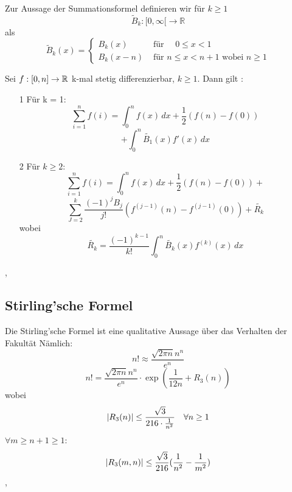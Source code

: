 Zur Aussage der Summationsformel definieren wir für $k \geq 1$
$$
\widetilde{B}_{k}:[0, \infty[\longrightarrow \mathbb{R}
$$
als
$$
\widetilde{B}_{k}(x)=\left\{\begin{array}{ll}
B_{k}(x) & \text { für } \quad 0 \leq x<1 \\
B_{k}(x-n) & \text { für } n \leq x<n+1 \text { wobei } n \geq 1
\end{array}\right.
$$

\Satz[5.44] Sei \(f:[0,n] \rightarrow \mathbb{R} \) k-mal stetig differenzierbar, \(k \geq 1\). Dann gilt :
\begin{enumerate}
    \item [1] Für k = 1:
    \[ \sum_{i=1}^{n} f(i) = \int_{0}^{n} f(x) \,dx + \frac{1}{2} (f(n) - f(0))\]
    \[ + \int_{0}^{n} \tilde{B_1} (x) f'(x) \,dx \]
    \item [2] Für \( k \geq 2\):
    \[ \sum_{i=1}^{n}f(i) = \int_{0}^{n} f(x) \,dx + \frac{1}{2}(f(n) - f(0)) + \] 
    \[\sum_{J=2}^{k} \frac{(-1)^jB_j}{j!}(f^{(j-1)}(n) - f^{(j-1)}(0)) + \tilde{R_k}\]
    wobei
    \[ \tilde{R_k} = \frac{(-1)^{k-1}}{k!} \int_{0}^{n} \tilde{B_k}(x)f^{(k)}(x) \,dx \]
\end{enumerate}
\sep
\subsection{Stirling'sche Formel}
Die Stirling'sche Formel ist eine qualitative Aussage über das Verhalten der Fakultät
Nämlich:
\[ n! \approx \frac{\sqrt{2 \pi n} n^n}{e^n}\]
\Satz[5.47] \[n! = \frac{\sqrt{2 \pi n} n^n}{e^n} \cdot \exp(\frac{1}{12n}+ R_3(n))\]
wobei
\[ \left\lvert R_3(n) \right\rvert \leq \frac{\sqrt{3}}{216 \cdot \frac{1}{n^2}} \quad \forall n \geq 1\]
\Lemma[5.48] \( \forall m \geq n + 1 \geq 1\):
\[ \left\lvert R_3(m,n) \right\rvert \leq \frac{\sqrt{3}}{216}( \frac{1}{n^2} - \frac{1}{m^2})\]
\sep
